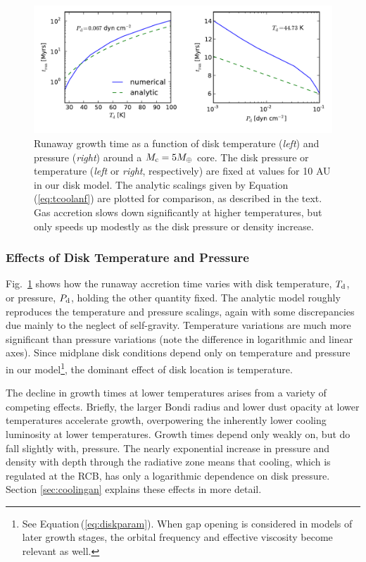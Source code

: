 \documentclass[apj, numberedappendix]{emulateapj}
\newcommand{\Eq}[1]{Equation\,(\ref{#1})}
\newcommand{\Fig}[1]{Fig.~\ref{#1}}
\newcommand{\di}{_{\rm d}}
\begin{document}
\begin{figure}[tb]
\centering
\includegraphics[width=1.\textwidth]{../../figs/ModelAtmospheres/RadSelfGravPoly/PaperFigs/TdPd_effect.pdf}
\vspace{-0.3in}
\caption{Runaway growth time as a function of disk temperature (\emph{left}) and pressure (\emph{right}) around a $M_{\rm c} = 5 M_{\oplus}$ core.   The disk pressure or temperature (\emph{left} or \emph{right}, respectively) are fixed at values for 10 AU in our disk model.   The analytic scalings given by \Eq{eq:tcoolanf} are plotted for comparison, as described in the text.  Gas accretion slows down significantly at higher temperatures, but only speeds up modestly as the disk pressure or density increase.} 
\label{fig:TPeffects}
\end{figure}

\subsubsection{Effects of Disk Temperature and Pressure}
\label{sec:TPeffects}

\Fig{fig:TPeffects} shows how the runaway accretion time varies with disk temperature, $T\di$, or pressure, $P\di$, holding the other quantity fixed.   The analytic model roughly reproduces the temperature and pressure scalings, again with some discrepancies due mainly to the neglect of self-gravity.  Temperature variations are much more significant than pressure variations (note the difference in logarithmic and linear axes).  Since midplane disk conditions depend only on temperature and pressure in our model\footnote{See \Eq{eq:diskparam}.  When gap opening is considered in models of later growth stages, the orbital frequency and effective viscosity become relevant as well.}, the dominant effect of disk location is temperature.  

The decline in growth times at lower temperatures arises from a variety of competing effects.  Briefly, the larger Bondi radius and lower dust opacity at lower temperatures accelerate growth, overpowering the inherently lower cooling luminosity at lower temperatures.  Growth times depend only weakly on, but do fall slightly with, pressure.  The nearly exponential increase in pressure and density with depth through the radiative zone means that cooling, which is regulated at the RCB, has only a logarithmic dependence on disk pressure.   Section \ref{sec:coolingan} explains these effects in more detail.
\end{document}

